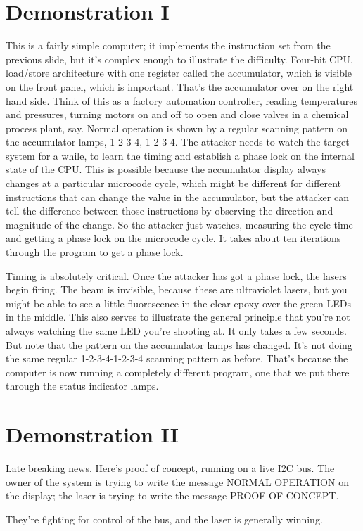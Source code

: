\documentclass[letterpaper]{article}
\begin{document}
\section{Demonstration I}
This is a fairly simple computer; it implements the instruction set from the
previous slide, but it's complex enough to illustrate the difficulty. Four-bit
CPU, load/store architecture with one register called the accumulator, which is
visible on the front panel, which is important. That's the accumulator over on
the right hand side. Think of this as a factory automation controller, reading
temperatures and pressures, turning motors on and off to open and close valves
in a chemical process plant, say. Normal operation is shown by a regular
scanning pattern on the accumulator lamps, 1-2-3-4, 1-2-3-4. The attacker needs
to watch the target system for a while, to learn the timing and establish a
phase lock on the internal state of the CPU. This is possible because the
accumulator display always changes at a particular microcode cycle, which might
be different for different instructions that can change the value in the
accumulator, but the attacker can tell the difference between those
instructions by observing the direction and magnitude of the change. So the
attacker just watches, measuring the cycle time and getting a phase lock on the
microcode cycle. It takes about ten iterations through the program to get a
phase lock.

Timing is absolutely critical. Once the attacker has got a phase lock, the
lasers begin firing. The beam is invisible, because these are ultraviolet
lasers, but you might be able to see a little fluorescence in the clear epoxy
over the green LEDs in the middle. This also serves to illustrate the general
principle that you're not always watching the same LED you're shooting at. It
only takes a few seconds. But note that the pattern on the accumulator lamps
has changed. It's not doing the same regular 1-2-3-4-1-2-3-4 scanning pattern
as before. That's because the computer is now running a completely different
program, one that we put there through the status indicator lamps.
\section{Demonstration II}
Late breaking news. Here's proof of concept, running on a live I2C bus. The
owner of the system is trying to write the message NORMAL OPERATION on the
display; the laser is trying to write the message PROOF OF CONCEPT.

They're fighting for control of the bus, and the laser is generally winning.
\end{document}
